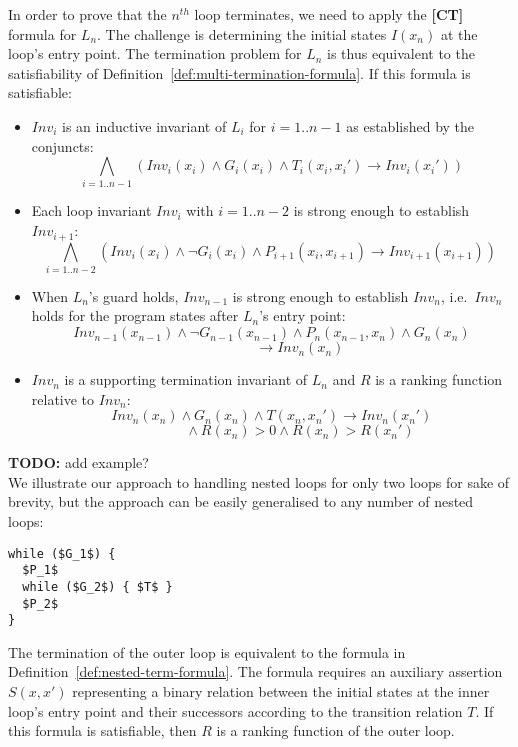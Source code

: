 \documentclass[a4paper]{llncs}
\newcommand{\todo}[1]{{\bf TODO:} #1}
\begin{document}
In order to prove that the $n^{th}$ loop terminates, we need to apply the {\bf [CT]} formula for $L_n$.
The challenge is determining the initial states  $I(x_n)$ at the loop's entry point.  
The termination problem for $L_n$ is thus equivalent to the satisfiability of
Definition~\ref{def:multi-termination-formula}.  If this formula is satisfiable:
\begin{itemize}
\item $Inv_i$ is an inductive invariant of $L_i$ for $i=1..{n-1}$ as established by the conjuncts:
$$\bigwedge_{i=1..n{-}1} (Inv_i(x_i) \wedge G_i(x_i) \wedge T_i(x_i, x_i') \rightarrow Inv_i(x_i')) $$

\item Each loop invariant $Inv_i$ with $i=1..{n-2}$ is strong enough to establish $Inv_{i+1}$:
$$\bigwedge_{i=1..n{-}2} (Inv_i(x_i) \wedge \lnot G_i(x_i) \wedge P_{i+1}(x_i, x_{i+1}) {\rightarrow} Inv_{i+1}(x_{i+1})) ~$$

\item When $L_n$'s guard holds, $Inv_{n-1}$ 
is strong enough to establish $Inv_n$, i.e.~$Inv_n$ holds for the program states after $L_n$'s entry point:
$$ Inv_{n-1}(x_{n-1}) \wedge \lnot G_{n-1}(x_{n-1}) \wedge P_n(x_{n-1},x_n) \wedge G_n(x_n) $$
$$\qquad\qquad\rightarrow Inv_n(x_n)$$

\item $Inv_n$ is a supporting termination invariant of $L_n$ and $R$ is a ranking function relative to $Inv_n$:
$$Inv_n(x_n) \wedge G_n(x_n) \wedge T(x_n, x_n') \rightarrow Inv_n(x_n')$$
$$ \qquad \qquad \wedge R(x_n) > 0 \wedge R(x_n) > R(x_n')$$
\end{itemize}

\todo{add example?}\\

%
We illustrate our approach to handling nested loops for only two loops for
sake of brevity, but the approach can be easily generalised to any number of
nested loops:
%
\begin{lstlisting}[mathescape=true]
while ($G_1$) { 
  $P_1$ 
  while ($G_2$) { $T$ }
  $P_2$
}
\end{lstlisting}

The termination of the outer loop is equivalent to the formula in
Definition~\ref{def:nested-term-formula}.  The formula requires an auxiliary
assertion $S(x,x')$ representing a binary relation between the initial
states at the inner loop's entry point and their successors according to the
transition relation $T$.  If this formula is satisfiable, then $R$ is a
ranking function of the outer loop.
\end{document}
